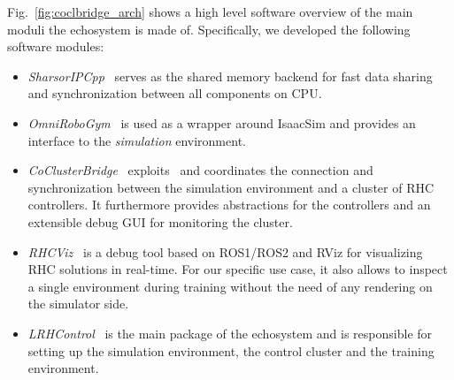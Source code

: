 Fig.~\ref{fig:coclbridge_arch} shows a high level software overview of the main moduli the echosystem is made of. Specifically, we developed the following software modules:
\begin{itemize}
	\item \textit{SharsorIPCpp}~\cite{mystuff::sharsoripcpp} serves as the shared memory backend for fast data sharing and synchronization between all components on CPU.
	\item \textit{OmniRoboGym}~\cite{mystuff::omnirobogym} is used as a wrapper around IsaacSim and provides an interface to the \textit{simulation} environment.
	\item \textit{CoClusterBridge}~\cite{mystuff::coclusterbridge} exploits~\cite{mystuff::sharsoripcpp} and coordinates the connection and synchronization between the simulation environment and a cluster of RHC controllers. It furthermore provides abstractions for the controllers and an extensible debug GUI for monitoring the cluster.
	\item \textit{RHCViz}~\cite{mystuff::rhcviz} is a debug tool based on ROS1/ROS2 and RViz for visualizing RHC solutions in real-time. For our specific use case, it also allows to inspect a single environment during training without the need of any rendering on the simulator side.
	\item \textit{LRHControl}~\cite{mystuff::lrhccontrol} is the main package of the echosystem and is responsible for setting up the simulation environment, the control cluster and the training environment.
\end{itemize}




